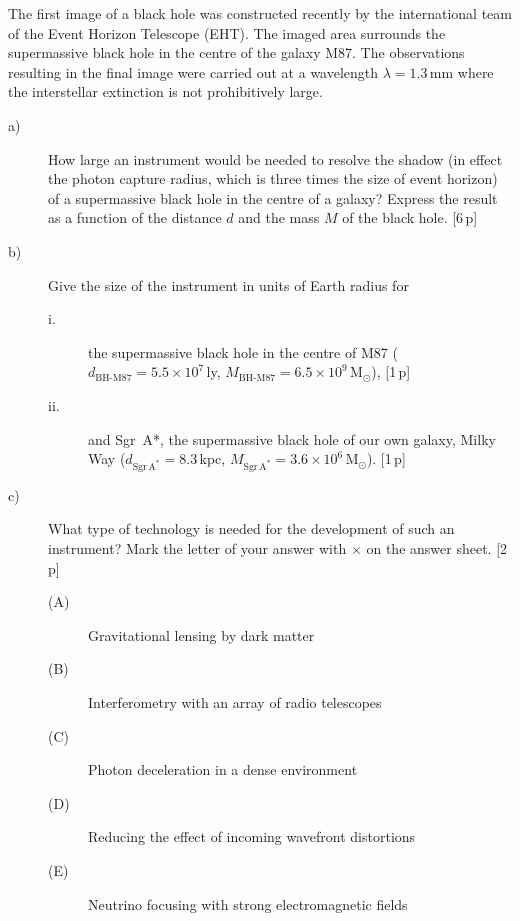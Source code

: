 The first image of a black hole was constructed recently by the international
team of the Event Horizon Telescope (EHT). The imaged area surrounds the
supermassive black hole in the centre of the galaxy M87. The observations
resulting in the final image were carried out at a wavelength
$\lambda = 1.3$\,mm where the interstellar extinction is not prohibitively
large.

\begin{description}
\item[a)] How large an instrument would be needed to resolve the shadow (in
  effect the photon capture radius, which is three times the size of event
  horizon) of a supermassive black hole in the centre of a galaxy? Express the
  result as a function of the distance $d$ and the mass $M$ of the black hole.
  \hfill[6\,p]
\item[b)] Give the size of the instrument in units of Earth radius for
  \begin{description}
  \item[i.] the supermassive black hole in the centre of M87
    ($d_{\mathrm{BH\text{-}M87}} = 5.5 \times 10^7$\,ly,
    $M_{\mathrm{BH\text{-}M87}} = 6.5 \times 10^9\,\mathrm{M}_\odot$),
    \hfill[1\,p]
  \item[ii.] and Sgr~A*, the supermassive black hole of our own galaxy, Milky
    Way ($d_{\mathrm{Sgr\,A^*}} = 8.3$\,kpc,
    $M_{\mathrm{Sgr\,A^*}} = 3.6 \times 10^6\,\mathrm{M}_\odot$). \hfill[1\,p]
  \end{description}
\item[c)] What type of technology is needed for the development of such an
  instrument? Mark the letter of your answer with $\times$ on the answer
  sheet. \hfill[2\,p]
  \begin{description}
  \item[(A)] Gravitational lensing by dark matter
  \item[(B)] Interferometry with an array of radio telescopes
  \item[(C)] Photon deceleration in a dense environment
  \item[(D)] Reducing the effect of incoming wavefront distortions
  \item[(E)] Neutrino focusing with strong electromagnetic fields
  \end{description}
\end{description}

